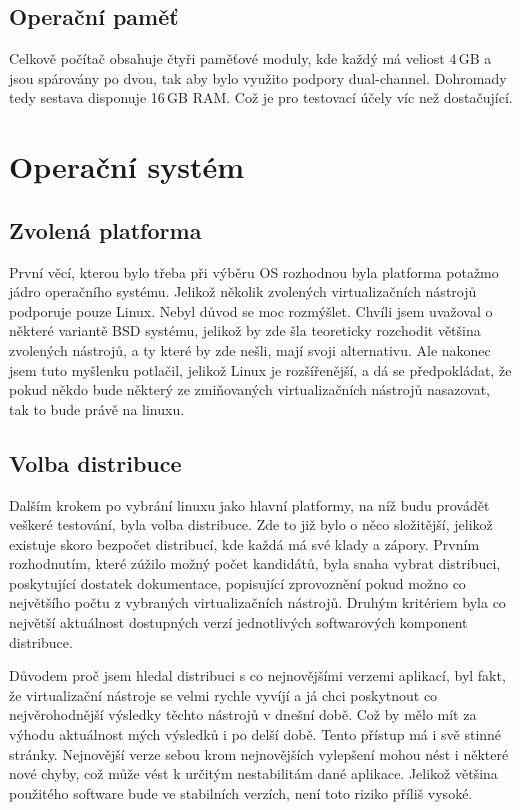 \subsection{Operační paměť}
Celkově počítač obsahuje čtyři paměťové moduly, kde každý má veliost 4\,GB a jsou spárovány po dvou, tak aby bylo využito podpory dual-channel. Dohromady tedy sestava disponuje 16\,GB RAM. Což je pro testovací účely víc než dostačující.
\section{Operační systém}
\subsection{Zvolená platforma}
První věcí, kterou bylo třeba při výběru OS rozhodnou byla platforma potažmo jádro operačního systému. Jelikož několik zvolených virtualizačních nástrojů podporuje pouze Linux. Nebyl důvod se moc rozmýšlet. Chvíli jsem uvažoval o některé variantě BSD systému, jelikož by zde šla teoreticky rozchodit většina zvolených nástrojů, a ty které by zde nešli, mají svoji alternativu. Ale nakonec jsem tuto myšlenku potlačil, jelikož Linux je rozšířenější, a dá se předpokládat, že pokud někdo bude některý ze zmiňovaných virtualizačních nástrojů nasazovat, tak to bude právě na linuxu.

\subsection{Volba distribuce}
Dalším krokem po vybrání linuxu jako hlavní platformy, na níž budu provádět veškeré testování, byla volba distribuce. Zde to již bylo o něco složitější, jelikož existuje skoro bezpočet distribucí, kde každá má své klady a zápory. Prvním rozhodnutím, které zúžilo možný počet kandidátů, byla snaha vybrat distribuci, poskytující dostatek dokumentace, popisující zprovoznění pokud možno co největšího počtu z vybraných virtualizačních nástrojů. Druhým kritériem byla co největší aktuálnost dostupných verzí jednotlivých softwarových komponent distribuce.

Důvodem proč jsem hledal distribuci s co nejnovějšími verzemi aplikací, byl fakt, že virtualizační nástroje se velmi rychle vyvíjí a já chci poskytnout co nejvěrohodnější výsledky těchto nástrojů v dnešní době. Což by mělo mít za výhodu aktuálnost mých výsledků i po delší době. Tento přístup má i svě stinné stránky. Nejnovější verze sebou krom nejnovějších vylepšení mohou nést i některé nové chyby, což může vést k určitým nestabilitám dané aplikace. Jelikož většina použitého software bude ve stabilních verzích, není toto riziko příliš vysoké.

